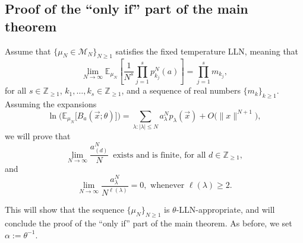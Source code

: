 \documentclass[11pt]{article}
\theoremstyle{plain}
\newcommand{\Z}{\mathbb Z}
\newcommand{\E}{\mathbb E}
\newcommand{\la}{\lambda}
\newcommand{\M}{\mathcal M}
\newcommand{\vecx}{\vec{x}}
\begin{document}
\subsection{Proof of the ``only if'' part of the main theorem}


Assume that $\{\mu_N\in\M_N\}_{N\ge 1}$ satisfies the fixed temperature LLN, meaning that
    \begin{equation}\label{assumption_LLN}
        \lim_{N\to\infty}{ \mathbb{E}_{\mu_N}\left[ \frac{1}{N^s}\prod_{j=1}^s{ p^{N}_{k_j}(a) } \right] } = \prod_{j=1}^s{m_{k_j}},
    \end{equation}
for all $s\in\Z_{\ge 1}$, $k_1,\dots,k_s\in\Z_{\ge 1}$, and a sequence of real numbers $\{m_k\}_{k\ge 1}$.
Assuming the expansions
\begin{equation}\label{eq:bessel_expansion}
\ln\Big( \E_{\mu_N}\big[ B_a(\vecx;\theta) \big] \Big) = \sum_{\la\colon|\la|\le N}{ a_\la^N p_\la(\vecx) }+O\big(\|x\|^{N+1}\big),
\end{equation}
we will prove that
\begin{equation}\label{eq:to_prove_1}
\lim_{N\to\infty}{\frac{a_{(d)}^N}{N}}\,\text{ exists and is finite, for all }d\in\Z_{\ge 1},
\end{equation}
and
\begin{equation}\label{eq:to_prove_2}
\lim_{N\to\infty}{\frac{a_\la^N}{N^{\ell(\la)}}}=0,\text{ whenever }\ell(\la)\ge 2.
\end{equation}

\smallskip

This will show that the sequence $\{\mu_N\}_{N\ge 1}$ is $\theta$-LLN-appropriate, and will conclude the proof of the ``only if'' part of the main theorem.
As before, we set $\alpha:=\theta^{-1}$.

\bigskip
\end{document}
